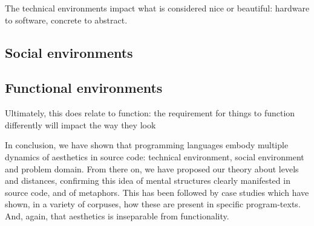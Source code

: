 The technical environments impact what is considered nice or beautiful: hardware to software, concrete to abstract.

\subsection{Social environments}
\label{subsec:social-environments}

\subsection{Functional environments}
\label{subsec:functional-environments}

Ultimately, this does relate to function: the requirement for things to function differently will impact the way they look

\spacer


In conclusion, we have shown that programming languages embody multiple dynamics of aesthetics in source code: technical environment, social environment and problem domain. From there on, we have proposed our theory about levels and distances, confirming this idea of mental structures clearly manifested in source code, and of metaphors. This has been followed by case studies which have shown, in a variety of corpuses, how these are present in specific program-texts. And, again, that aesthetics is inseparable from functionality.